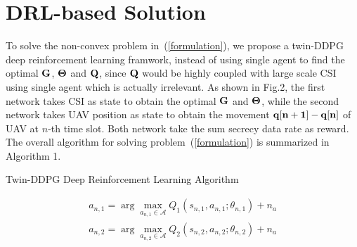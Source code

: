 \documentclass[journal]{IEEEtran}
\begin{document}
\section{DRL-based Solution}
To solve the non-convex problem in~(\ref{formulation}), we propose a twin-DDPG deep reinforcement learning framwork, instead of using single agent to find the optimal $\bf{G} $, $\bf{\Theta} $ and $\bf{Q}$, since $\bf{Q}$ would be highly coupled with large scale CSI using single agent which is actually irrelevant. As shown in Fig.2, the first network takes CSI as state to obtain the optimal $\bf{G} $ and $\bf{\Theta} $, while the second network takes UAV position as state to obtain the movement $\bf{q}[n+1]-\bf{q}[n]$ of UAV at $n$-th time slot. Both network take the sum secrecy data rate as reward. The overall algorithm for solving problem~(\ref{formulation}) is summarized in Algorithm 1.
\begin{algorithm}[t]
	\caption{Twin-DDPG Deep Reinforcement Learning Algorithm}
	\begin{algorithmic}[1]
        \begin{equation}
          \begin{aligned}
            a_{n,1}=\arg \max _{a_{n,1} \in \mathcal{A}} Q_1\left(s_{n,1}, a_{n,1} ; \theta_{n,1}\right)+n_{a}\\
            a_{n,2}=\arg \max _{a_{n,2} \in \mathcal{A}} Q_2\left(s_{n,2}, a_{n,2} ; \theta_{n,2}\right)+n_{a}
          \end{aligned}            
        \end{equation}
      \ENDFOR
    \ENDFOR
	\end{algorithmic}
\end{algorithm}
\end{document}
